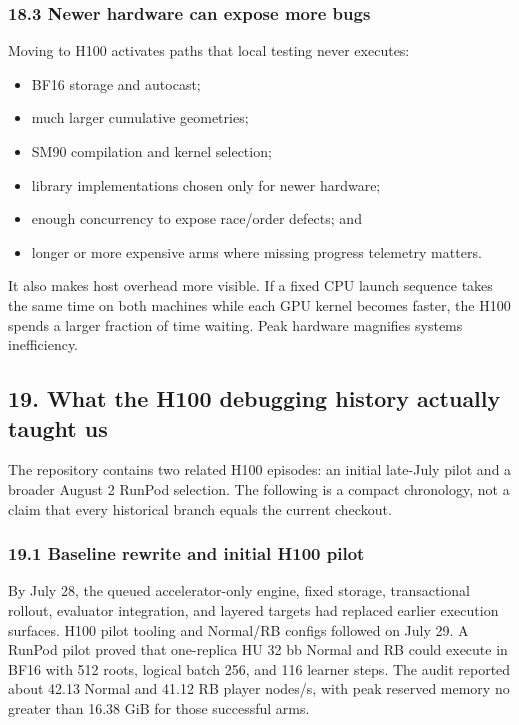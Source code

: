 \documentclass[
  10pt,
  letterpaper,
]{article}
\providecommand{\tightlist}{%
  \setlength{\itemsep}{0pt}\setlength{\parskip}{0pt}}
\begin{document}
\subsubsection{18.3 Newer hardware can expose more
bugs}\label{183-newer-hardware-can-expose-more-bugs}

Moving to H100 activates paths that local testing never executes:

\begin{itemize}
\tightlist
\item
  BF16 storage and autocast;
\item
  much larger cumulative geometries;
\item
  SM90 compilation and kernel selection;
\item
  library implementations chosen only for newer hardware;
\item
  enough concurrency to expose race/order defects; and
\item
  longer or more expensive arms where missing progress telemetry
  matters.
\end{itemize}

It also makes host overhead more visible. If a fixed CPU launch sequence
takes the same time on both machines while each GPU kernel becomes
faster, the H100 spends a larger fraction of time waiting. Peak hardware
magnifies systems inefficiency.

\subsection{19. What the H100 debugging history actually taught
us}\label{19-what-the-h100-debugging-history-actually-taught-us}

The repository contains two related H100 episodes: an initial late-July
pilot and a broader August 2 RunPod selection. The following is a
compact chronology, not a claim that every historical branch equals the
current checkout.

\subsubsection{19.1 Baseline rewrite and initial H100
pilot}\label{191-baseline-rewrite-and-initial-h100-pilot}

By July 28, the queued accelerator-only engine, fixed storage,
transactional rollout, evaluator integration, and layered targets had
replaced earlier execution surfaces. H100 pilot tooling and Normal/RB
configs followed on July 29. A RunPod pilot proved that one-replica HU
32 bb Normal and RB could execute in BF16 with 512 roots, logical batch
256, and 116 learner steps. The audit reported about 42.13 Normal and
41.12 RB player nodes/s, with peak reserved memory no greater than 16.38
GiB for those successful arms.
\end{document}

